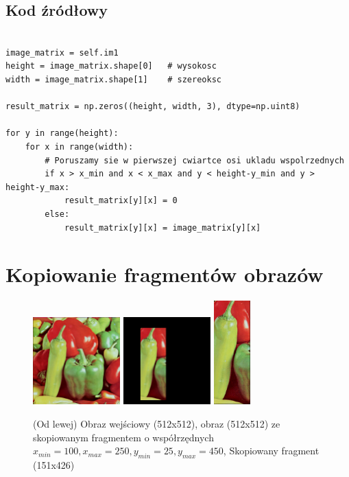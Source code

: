 \documentclass[final,a4paper,openany,12pt]{mwbk}
\begin{document}
\subsection*{Kod źródłowy}


\begin{lstlisting}[caption= Wycinanie fragmentów obrazu]

image_matrix = self.im1
height = image_matrix.shape[0]   # wysokosc
width = image_matrix.shape[1]    # szereoksc

result_matrix = np.zeros((height, width, 3), dtype=np.uint8)

for y in range(height):
    for x in range(width): 
        # Poruszamy sie w pierwszej cwiartce osi ukladu wspolrzednych
        if x > x_min and x < x_max and y < height-y_min and y > height-y_max:
            result_matrix[y][x] = 0
        else:
            result_matrix[y][x] = image_matrix[y][x]

\end{lstlisting}

\section{ Kopiowanie fragmentów obrazów}

\begin{figure}[H]
	\begin{center}
		\includegraphics[width=0.3\textwidth]{1/1Geo_Copy_Original}
		\includegraphics[width=0.3\textwidth]{1/1Geo_Copy_Result}
		\includegraphics[height=4cm]{1/1Geo_Copy_Result_Interp}
	\end{center}
	\caption{(Od lewej) Obraz wejściowy (512x512), obraz (512x512) ze skopiowanym fragmentem o współrzędnych $x_{min}=100, x_{max}=250, y_{min}=25, y_{max}=450$, Skopiowany fragment (151x426) }
\end{figure}
\end{document}
